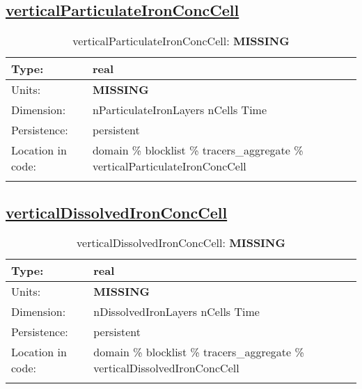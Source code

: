\subsection[verticalParticulateIronConcCell]{\hyperref[sec:var_tab_tracers_aggregate]{verticalParticulateIronConcCell}}
\label{subsec:var_sec_tracers_aggregate_verticalParticulateIronConcCell}
\begin{center}
\begin{longtable}{| p{2.0in} | p{4.0in} |}
        \hline 
        Type: & real \\
        \hline 
        Units: & {\bf \color{red} MISSING} \\
        \hline 
        Dimension: & nParticulateIronLayers nCells Time \\
        \hline 
        Persistence: & persistent \\
        \hline 
         Location in code: & domain \% blocklist \% tracers\_aggregate \% verticalParticulateIronConcCell \\
         \hline 
    \caption{verticalParticulateIronConcCell: {\bf \color{red} MISSING}}
\end{longtable}
\end{center}
\subsection[verticalDissolvedIronConcCell]{\hyperref[sec:var_tab_tracers_aggregate]{verticalDissolvedIronConcCell}}
\label{subsec:var_sec_tracers_aggregate_verticalDissolvedIronConcCell}
\begin{center}
\begin{longtable}{| p{2.0in} | p{4.0in} |}
        \hline 
        Type: & real \\
        \hline 
        Units: & {\bf \color{red} MISSING} \\
        \hline 
        Dimension: & nDissolvedIronLayers nCells Time \\
        \hline 
        Persistence: & persistent \\
        \hline 
         Location in code: & domain \% blocklist \% tracers\_aggregate \% verticalDissolvedIronConcCell \\
         \hline 
    \caption{verticalDissolvedIronConcCell: {\bf \color{red} MISSING}}
\end{longtable}
\end{center}
